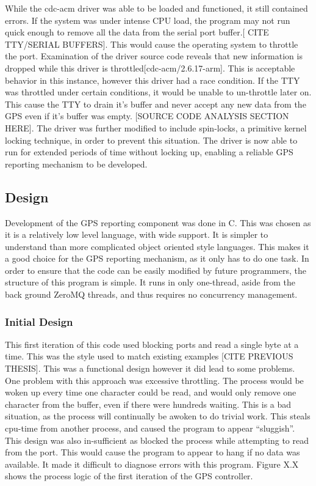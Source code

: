 While the cdc-acm driver was able to be loaded and functioned, it still contained errors. If the system was under intense CPU load, the program may not run quick enough to remove all the data from the serial port buffer.[ CITE TTY/SERIAL BUFFERS]. This would cause the operating system to throttle the port. Examination of the driver source code reveals that new information is dropped while this driver is throttled[cdc-acm/2.6.17-arm]. This is acceptable behavior in this instance, however this driver had a race condition. If the TTY was throttled under certain conditions, it would be unable to un-throttle later on. This cause the TTY to drain it’s buffer and never accept any new data from the GPS even if it’s buffer was empty. [SOURCE CODE ANALYSIS SECTION HERE]. The driver was further modified to include spin-locks, a primitive kernel locking technique, in order to prevent this situation. The driver is now able to run for extended periods of time without locking up, enabling a reliable GPS reporting mechanism to be developed. 

\subsection {Design}

Development of the GPS reporting component was done in C. This was chosen as it is a relatively low level language, with wide support. It is simpler to understand than more complicated object oriented style languages. This makes it a good choice for the GPS reporting mechanism, as it only has to do one task. In order to ensure that the code can be easily modified by future programmers, the structure of this program is simple. It runs in only one-thread, aside from the back ground ZeroMQ threads, and thus requires no concurrency management.

\subsubsection{Initial Design}

This first iteration of this code used blocking ports and read a single byte at a time. This was the style used to match existing examples [CITE PREVIOUS THESIS]. This was a functional design however it did lead to some problems. One problem with this approach was excessive throttling. The process would be woken up every time one character could be read, and would only remove one character from the buffer, even if there were hundreds waiting. This is a bad situation, as the process will continually be awoken to do trivial work. This steals cpu-time from another process, and caused the program to appear “sluggish”. This design was also in-sufficient as blocked the process while attempting to read from the port. This would cause the program to appear to hang if no data was available. It made it difficult to diagnose errors with this program. Figure X.X shows the process logic of the first iteration of the GPS controller.

